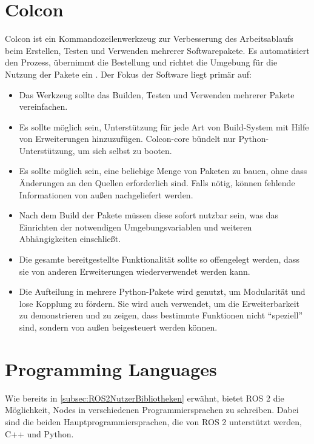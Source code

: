 \section{Colcon}\label{sec:Colcon}
Colcon ist ein Kommandozeilenwerkzeug zur Verbesserung des Arbeitsablaufs beim Erstellen, Testen und Verwenden mehrerer Softwarepakete. Es automatisiert den Prozess, übernimmt die Bestellung und richtet die Umgebung für die Nutzung der Pakete ein \cite{colcon_docs}. Der Fokus der Software liegt primär auf:\\
\begin{itemize}
    \item Das Werkzeug sollte das Builden, Testen und Verwenden mehrerer Pakete vereinfachen.
    \item Es sollte möglich sein, Unterstützung für jede Art von Build-System mit Hilfe von Erweiterungen hinzuzufügen. Colcon-core bündelt nur Python-Unterstützung, um sich selbst zu booten.
    \item Es sollte möglich sein, eine beliebige Menge von Paketen zu bauen, ohne dass Änderungen an den Quellen erforderlich sind. Falls nötig, können fehlende Informationen von außen nachgeliefert werden.
    \item Nach dem Build der Pakete müssen diese sofort nutzbar sein, was das Einrichten der notwendigen Umgebungsvariablen und weiteren Abhängigkeiten einschließt.
    \item Die gesamte bereitgestellte Funktionalität sollte so offengelegt werden, dass sie von anderen Erweiterungen wiederverwendet werden kann.
    \item Die Aufteilung in mehrere Python-Pakete wird genutzt, um Modularität und lose Kopplung zu fördern. Sie wird auch verwendet, um die Erweiterbarkeit zu demonstrieren und zu zeigen, dass bestimmte Funktionen nicht ``speziell'' sind, sondern von außen beigesteuert werden können.
\end{itemize}


\section{Programming Languages}
Wie bereits in \autoref{subsec:ROS2NutzerBibliotheken} erwähnt, bietet \ac{ROS} 2 die Möglichkeit, Nodes in verschiedenen Programmiersprachen zu schreiben. Dabei sind die beiden Hauptprogrammiersprachen, die von \ac{ROS} 2 unterstützt werden, C++ und Python.\\

